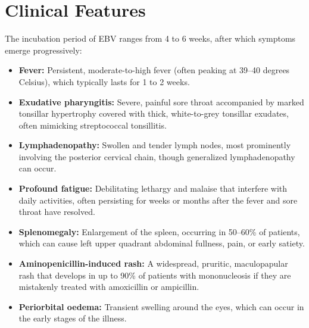\section*{Clinical Features}
The incubation period of EBV ranges from 4 to 6 weeks, after which symptoms emerge progressively:
\begin{itemize}
    \item \textbf{Fever:} Persistent, moderate-to-high fever (often peaking at 39--40 degrees Celsius), which typically lasts for 1 to 2 weeks.
    \item \textbf{Exudative pharyngitis:} Severe, painful sore throat accompanied by marked tonsillar hypertrophy covered with thick, white-to-grey tonsillar exudates, often mimicking streptococcal tonsillitis.
    \item \textbf{Lymphadenopathy:} Swollen and tender lymph nodes, most prominently involving the posterior cervical chain, though generalized lymphadenopathy can occur.
    \item \textbf{Profound fatigue:} Debilitating lethargy and malaise that interfere with daily activities, often persisting for weeks or months after the fever and sore throat have resolved.
    \item \textbf{Splenomegaly:} Enlargement of the spleen, occurring in 50--60\% of patients, which can cause left upper quadrant abdominal fullness, pain, or early satiety.
    \item \textbf{Aminopenicillin-induced rash:} A widespread, pruritic, maculopapular rash that develops in up to 90\% of patients with mononucleosis if they are mistakenly treated with amoxicillin or ampicillin.
    \item \textbf{Periorbital oedema:} Transient swelling around the eyes, which can occur in the early stages of the illness.
\end{itemize}

